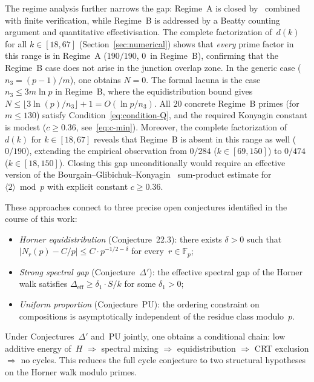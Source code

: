 \documentclass[12pt, a4paper]{amsart}
\theoremstyle{plain}
\theoremstyle{definition}
\theoremstyle{remark}
\newcommand{\Fp}{\mathbb{F}_p}
\begin{document}
The regime analysis further narrows the gap:
Regime~A is closed by~\cite{DiBenedetto2020} combined with
finite verification, while Regime~B is addressed by a Beatty
counting argument and quantitative effectivisation.
The complete factorization of~$d(k)$ for all $k \in [18, 67]$
(Section~\ref{sec:numerical}) shows that \emph{every} prime
factor in this range is in Regime~A ($190/190$, $0$~in
Regime~B), confirming that the Regime~B case does not arise
in the junction overlap zone.
In the generic case ($n_3 = (p-1)/m$), one obtains $N = 0$.
The formal lacuna is the case $n_3 \leq 3m\ln p$ in Regime~B,
where the equidistribution bound gives
$N \leq \lfloor 3\ln(p)/n_3 \rfloor + 1 = O(\ln p / n_3)$.
All $20$ concrete Regime~B primes (for $m \leq 130$) satisfy
Condition~\eqref{eq:condition-Q}, and the required Konyagin
constant is modest ($c \geq 0.36$,
see~\eqref{eq:c-min}).
Moreover, the complete factorization of~$d(k)$ for
$k \in [18, 67]$ reveals that Regime~B is absent in this
range as well ($0/190$), extending the empirical observation
from $0/284$ ($k \in [69, 150]$) to $0/474$
($k \in [18, 150]$).
Closing this gap unconditionally would require
an effective version of the Bourgain--Glibichuk--Konyagin~\cite{BGK2006}
sum-product estimate for $\langle 2 \rangle \bmod p$
with explicit constant $c \geq 0.36$.

These approaches connect to three precise open conjectures
identified in the course of this work:
\begin{itemize}
  \item \emph{Horner equidistribution}
    (Conjecture~22.3): there exists $\delta > 0$ such that
    $|N_r(p) - C/p| \leq C \cdot p^{-1/2-\delta}$ for
    every~$r \in \Fp$;
  \item \emph{Strong spectral gap}
    (Conjecture~$\Delta'$): the effective spectral gap of
    the Horner walk satisfies
    $\Delta_{\mathrm{eff}} \geq \delta_1 \cdot S/k$ for
    some $\delta_1 > 0$;
  \item \emph{Uniform proportion}
    (Conjecture~PU): the ordering constraint on
    compositions is asymptotically independent of the
    residue class modulo~$p$.
\end{itemize}
Under Conjectures~$\Delta'$ and~PU jointly, one obtains
a conditional chain:
low additive energy of~$H$
$\Rightarrow$ spectral mixing
$\Rightarrow$ equidistribution
$\Rightarrow$ CRT exclusion
$\Rightarrow$ no cycles.
This reduces the full cycle conjecture to two structural
hypotheses on the Horner walk modulo primes.
\end{document}
